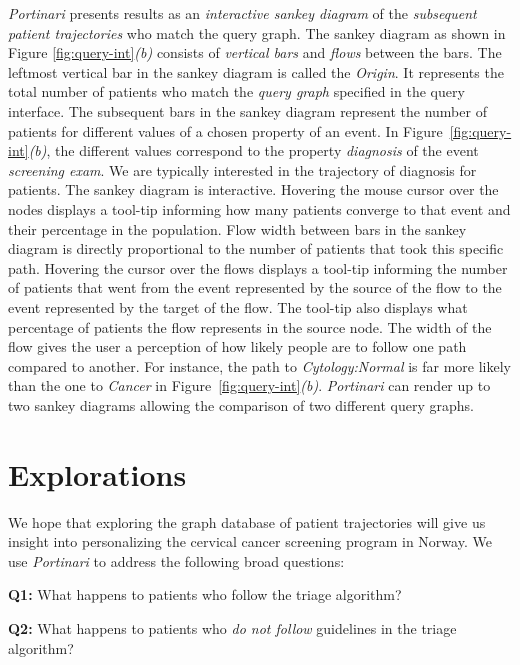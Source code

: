 \documentclass[10pt, conference]{IEEEtran}
\begin{document}
\textit{Portinari} presents results as an \emph{interactive sankey diagram} of the \emph{subsequent patient trajectories} who match the query graph. The sankey diagram as shown in Figure \ref{fig:query-int}\textit{(b)} consists of \emph{vertical bars} and \emph{flows} between the bars.  The leftmost vertical bar in the sankey diagram is called the \textit{Origin}. It represents the total number of patients who match the  \textit{query graph} specified in the query interface. The subsequent bars in the sankey diagram  represent the number of patients for different values of a chosen property of an event. In Figure~\ref{fig:query-int}\textit{(b)}, the different values correspond to the property \emph{diagnosis} of the event \emph{screening exam}. We are typically interested in the trajectory of diagnosis for patients.
The sankey diagram is interactive. Hovering the mouse cursor over the nodes displays a tool-tip informing how many patients converge to that event and their percentage in the population. Flow width between bars in the sankey diagram is directly proportional to the number of patients that took this specific path.  Hovering the cursor over the flows displays a tool-tip informing the number of patients  that went from the event represented by the source of the flow to the event represented by the target of the flow. The tool-tip also displays what percentage of patients the flow represents in the source node. The width of the flow gives the user a perception of how likely people are to follow one path compared to another. For instance, the path to \textit{Cytology:Normal} is far more likely than the one to \textit{Cancer} in Figure~\ref{fig:query-int}\textit{(b)}. \textit{Portinari} can render up to two sankey diagrams allowing the comparison of two different query graphs. 

\section{Explorations}
\label{sec:explorations}

We hope that exploring the graph database of patient trajectories will give us insight into personalizing the cervical cancer screening program in Norway. We use \textit{Portinari} to address the following broad questions:

\noindent \textbf{Q1:} What happens to patients who follow the triage algorithm?

\noindent \textbf{Q2:} What happens to patients who \emph{do not follow} guidelines in the triage algorithm?
\end{document}

